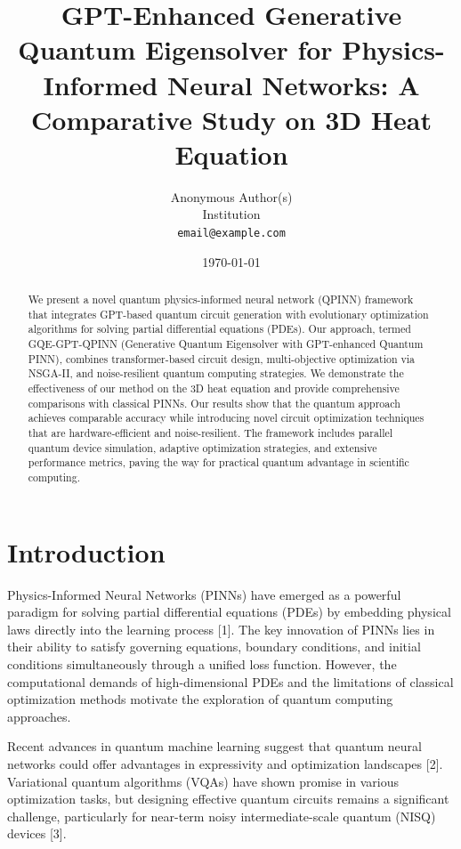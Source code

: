 \documentclass[11pt,a4paper,uplatex,dvipdfmx]{jsarticle}
\title{GPT-Enhanced Generative Quantum Eigensolver for Physics-Informed Neural Networks: A Comparative Study on 3D Heat Equation}
\author{
Anonymous Author(s)\\
Institution\\
\texttt{email@example.com}
}
\date{\today}
\begin{document}
\maketitle

\begin{abstract}
We present a novel quantum physics-informed neural network (QPINN) framework that integrates GPT-based quantum circuit generation with evolutionary optimization algorithms for solving partial differential equations (PDEs). Our approach, termed GQE-GPT-QPINN (Generative Quantum Eigensolver with GPT-enhanced Quantum PINN), combines transformer-based circuit design, multi-objective optimization via NSGA-II, and noise-resilient quantum computing strategies. We demonstrate the effectiveness of our method on the 3D heat equation and provide comprehensive comparisons with classical PINNs. Our results show that the quantum approach achieves comparable accuracy while introducing novel circuit optimization techniques that are hardware-efficient and noise-resilient. The framework includes parallel quantum device simulation, adaptive optimization strategies, and extensive performance metrics, paving the way for practical quantum advantage in scientific computing.
\end{abstract}

\section{Introduction}

Physics-Informed Neural Networks (PINNs) have emerged as a powerful paradigm for solving partial differential equations (PDEs) by embedding physical laws directly into the learning process [1]. The key innovation of PINNs lies in their ability to satisfy governing equations, boundary conditions, and initial conditions simultaneously through a unified loss function. However, the computational demands of high-dimensional PDEs and the limitations of classical optimization methods motivate the exploration of quantum computing approaches.

Recent advances in quantum machine learning suggest that quantum neural networks could offer advantages in expressivity and optimization landscapes [2]. Variational quantum algorithms (VQAs) have shown promise in various optimization tasks, but designing effective quantum circuits remains a significant challenge, particularly for near-term noisy intermediate-scale quantum (NISQ) devices [3].
\end{document}
